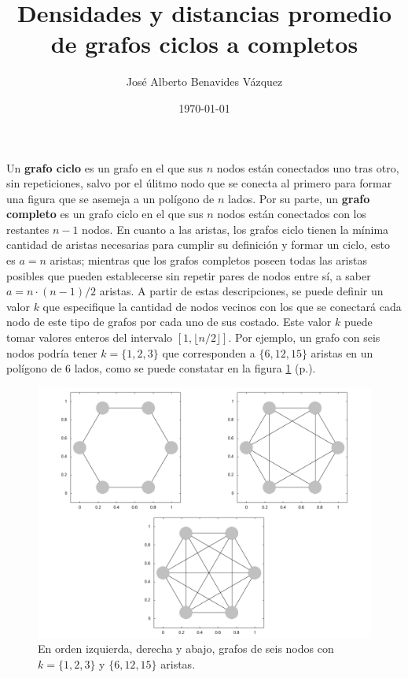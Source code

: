 \documentclass{article}
\title{Densidades y distancias promedio de grafos ciclos a completos}
\author{José Alberto Benavides Vázquez}
\date{\today}
\begin{document}
  \maketitle

  Un \textbf{grafo ciclo} es un grafo en el que sus $n$ nodos están conectados uno tras otro, sin repeticiones, salvo por el úlitmo nodo que se conecta al primero para formar una figura que se asemeja a un polígono de $n$ lados. Por su parte, un \textbf{grafo completo} es un grafo ciclo en el que sus $n$ nodos están conectados con los restantes $n - 1$ nodos. En cuanto a las aristas, los grafos ciclo tienen la mínima cantidad de aristas necesarias para cumplir su definición y formar un ciclo, esto es $a = n$ aristas; mientras que los grafos completos poseen todas las aristas posibles que pueden establecerse sin repetir pares de nodos entre sí, a saber $a = n \cdot (n-1)/2$ aristas. A partir de estas descripciones, se puede definir un valor $k$ que especifique la cantidad de nodos vecinos con los que se conectará cada nodo de este tipo de grafos por cada uno de sus costado. Este valor $k$ puede tomar valores enteros del intervalo $[1, \lfloor n / 2 \rfloor]$. Por ejemplo, un grafo con seis nodos podría tener $k = \{ 1, 2, 3 \}$ que corresponden a $\{ 6, 12, 15 \}$ aristas en un polígono de 6 lados, como se puede constatar en la figura \ref{grafoEjemplo6} (p.\pageref{grafoEjemplo6}).

  \begin{figure}[h]
    \includegraphics[width=1\textwidth]{grafoEjemplo6}
    \centering
    \caption{En orden izquierda, derecha y abajo, grafos de seis nodos con $k = \{ 1, 2, 3 \}$ y $\{ 6, 12, 15 \}$ aristas.}
    \label{grafoEjemplo6}
  \end{figure}

  

\end{document}
